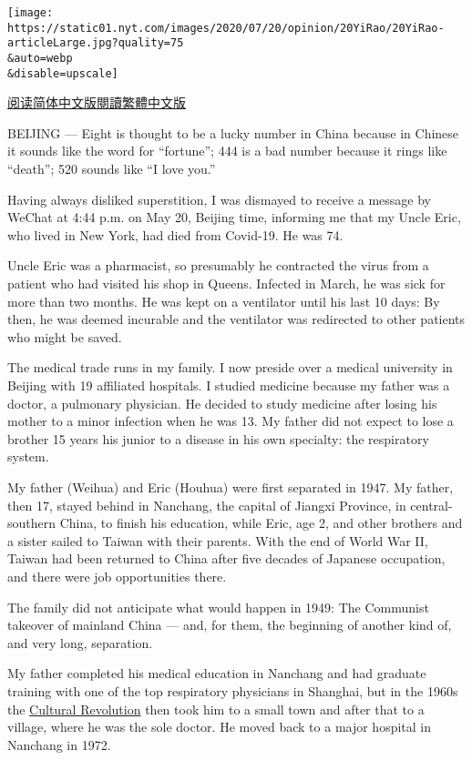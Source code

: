 \texttt{[image: https://static01.nyt.com/images/2020/07/20/opinion/20YiRao/20YiRao-articleLarge.jpg?quality=75\\\&auto=webp\\\&disable=upscale]}

\href{https://cn.nytimes.com/opinion/20200723/coronavirus-china-us/}{阅读简体中文版}\href{https://cn.nytimes.com/opinion/20200723/coronavirus-china-us/zh-hant/}{閱讀繁體中文版}

BEIJING --- Eight is thought to be a lucky number in China because in
Chinese it sounds like the word for ``fortune''; 444 is a bad number
because it rings like ``death''; 520 sounds like ``I love you.''

Having always disliked superstition, I was dismayed to receive a message
by WeChat at 4:44 p.m. on May 20, Beijing time, informing me that my
Uncle Eric, who lived in New York, had died from Covid-19. He was 74.

Uncle Eric was a pharmacist, so presumably he contracted the virus from
a patient who had visited his shop in Queens. Infected in March, he was
sick for more than two months. He was kept on a ventilator until his
last 10 days: By then, he was deemed incurable and the ventilator was
redirected to other patients who might be saved.

The medical trade runs in my family. I now preside over a medical
university in Beijing with 19 affiliated hospitals. I studied medicine
because my father was a doctor, a pulmonary physician. He decided to
study medicine after losing his mother to a minor infection when he was
13. My father did not expect to lose a brother 15 years his junior to a
disease in his own specialty: the respiratory system.

My father (Weihua) and Eric (Houhua) were first separated in 1947. My
father, then 17, stayed behind in Nanchang, the capital of Jiangxi
Province, in central-southern China, to finish his education, while
Eric, age 2, and other brothers and a sister sailed to Taiwan with their
parents. With the end of World War II, Taiwan had been returned to China
after five decades of Japanese occupation, and there were job
opportunities there.

The family did not anticipate what would happen in 1949: The Communist
takeover of mainland China --- and, for them, the beginning of another
kind of, and very long, separation.

My father completed his medical education in Nanchang and had graduate
training with one of the top respiratory physicians in Shanghai, but in
the 1960s the
\href{https://www.nytimes.com/2016/05/15/world/asia/china-cultural-revolution-explainer.html}{Cultural
Revolution} then took him to a small town and after that to a village,
where he was the sole doctor. He moved back to a major hospital in
Nanchang in 1972.


